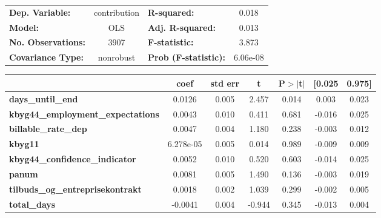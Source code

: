 \begin{center}
\begin{tabular}{lclc}
\toprule
\textbf{Dep. Variable:}                     &  contribution & \textbf{  R-squared:         } &     0.018   \\
\textbf{Model:}                             &      OLS      & \textbf{  Adj. R-squared:    } &     0.013   \\
\textbf{No. Observations:}                  &       3907    & \textbf{  F-statistic:       } &     3.873   \\
\textbf{Covariance Type:}                   &   nonrobust   & \textbf{  Prob (F-statistic):} &  6.06e-08   \\
\bottomrule
\end{tabular}
\begin{tabular}{lcccccc}
                                            & \textbf{coef} & \textbf{std err} & \textbf{t} & \textbf{P$> |$t$|$} & \textbf{[0.025} & \textbf{0.975]}  \\
\midrule
\textbf{days\_until\_end}                   &       0.0126  &        0.005     &     2.457  &         0.014        &        0.003    &        0.023     \\
\textbf{kbyg44\_employment\_expectations}   &       0.0043  &        0.010     &     0.411  &         0.681        &       -0.016    &        0.025     \\
\textbf{billable\_rate\_dep}                &       0.0047  &        0.004     &     1.180  &         0.238        &       -0.003    &        0.012     \\
\textbf{kbyg11}                             &    6.278e-05  &        0.005     &     0.014  &         0.989        &       -0.009    &        0.009     \\
\textbf{kbyg44\_confidence\_indicator}      &       0.0052  &        0.010     &     0.520  &         0.603        &       -0.014    &        0.025     \\
\textbf{panum}                              &       0.0081  &        0.005     &     1.490  &         0.136        &       -0.003    &        0.019     \\
\textbf{tilbuds\_og\_entreprisekontrakt}    &       0.0018  &        0.002     &     1.039  &         0.299        &       -0.002    &        0.005     \\
\textbf{total\_days}                        &      -0.0041  &        0.004     &    -0.944  &         0.345        &       -0.013    &        0.004     \\

\end{tabular}
\end{center}
